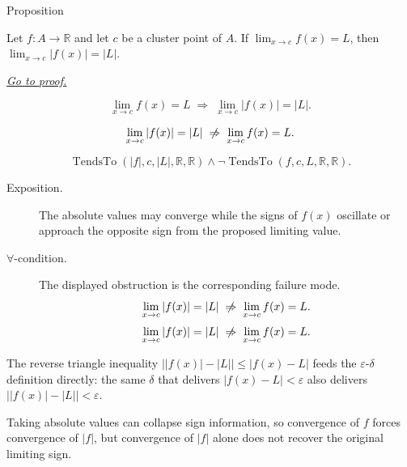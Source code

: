 
\begin{propositionbox}{Proposition}
\begin{proposition}
\label{prop:limit-absolute-value}
Let $f : A \to \mathbb{R}$ and let $c$ be a cluster point of $A$.
If $\lim_{x\to c}f(x)=L$, then
$\lim_{x\to c}|f(x)|=|L|$.

\smallskip\noindent
\hyperref[prf:limit-absolute-value]{\textit{Go to proof.}}
\end{proposition}
\end{propositionbox}

\begin{remark*}
\[
  \lim_{x\to c}f(x)=L
  \;\Rightarrow\;
  \lim_{x\to c}|f(x)|=|L|.
\]
\end{remark*}

\begin{remark*}
\[
  \lim_{x\to c}|f(x)|=|L|
  \;\centernot\Rightarrow\;
  \lim_{x\to c}f(x)=L.
\]
\end{remark*}

\begin{remark*}
\[
  \operatorname{TendsTo}(|f|,c,|L|,\mathbb{R},\mathbb{R})
  \wedge
  \neg\operatorname{TendsTo}(f,c,L,\mathbb{R},\mathbb{R}).
\]
\end{remark*}

\begin{remark*}
\begin{description}
  \item[Exposition.]
The absolute values may converge while the signs of $f(x)$ oscillate or
approach the opposite sign from the proposed limiting value.


  \item[\(\forall\)-condition.]
  The displayed obstruction is the corresponding failure mode.
  \[
\lim_{x\to c}|f(x)|=|L|
  \;\centernot\Rightarrow\;
  \lim_{x\to c}f(x)=L.
  \]
  \[
\lim_{x\to c}|f(x)|=|L|
  \;\centernot\Rightarrow\;
  \lim_{x\to c}f(x)=L.
  \]
\end{description}
\end{remark*}

\begin{remark*}[Interpretation]
The reverse triangle inequality
$\bigl||f(x)| - |L|\bigr| \leq |f(x) - L|$
feeds the $\varepsilon$-$\delta$ definition directly: the same
$\delta$ that delivers $|f(x)-L|<\varepsilon$
also delivers $\bigl||f(x)|-|L|\bigr|<\varepsilon$.


Taking absolute values can collapse sign information, so convergence of
$f$ forces convergence of $|f|$, but convergence of $|f|$ alone does not
recover the original limiting sign.
\end{remark*}

